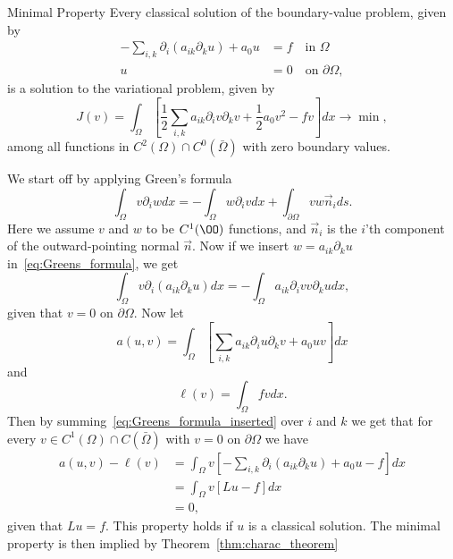 \begin{thmx}{Minimal Property}
    Every classical solution of the boundary-value problem, given by
\begin{align}
    -\sum_{i,k} \partial_i (a_{ik}\partial_k u) + a_0 u &= f \quad \text{in } \Omega  \\
    u &= 0 \quad \text{on } \partial \Omega,
\end{align}
    is a solution to the variational problem, given by
    \[
        J(v)=\int_\Omega \left [\frac{1}{2}\sum_{i,k} a_{ik} \partial_i v\partial_k v + \frac{1}{2} a_0 v^2 -fv\right ]dx \longrightarrow \min,
    \]
    among all functions in $C^2(\Omega)\cap C^0(\bar{\Omega})$ with zero boundary values. 
\end{thmx}
\begin{bev}
    We start off by applying Green's formula
    \begin{equation}
    \label{eq:Greens_formula}
        \int_\Omega v\partial_i w dx = -\int_\Omega w \partial_i v dx + \int_{\partial \Omega} v w \vec{n}_i ds.
    \end{equation}
    Here we assume $v$ and $w$ to be $C^1(\OO)$ functions, and $\vec{n}_i$ is the $i$'th component of the outward-pointing normal $\vec{n}$.
    Now if we insert $w=a_{ik}\partial_k u$ in~\eqref{eq:Greens_formula}, we get
    \begin{equation}
    \label{eq:Greens_formula_inserted}
        \int_\Omega v\partial_i (a_{ik} \partial_k u) dx = -\int_\Omega a_{ik} \partial_i v v\partial_k u dx,
    \end{equation}
    given that $v=0$ on $\partial \Omega$.
    Now let 
    \begin{equation}
    \label{eq:a(u,v)}
        a(u,v) = \int_\Omega \left[\sum_{i,k} a_{ik} \partial_i u \partial_k v +a_0 uv \right]dx
    \end{equation}
    and
    \begin{equation}
    \label{eq:l(v)}
        \ell(v) = \int_\Omega fv dx.
    \end{equation}
    Then by summing~\eqref{eq:Greens_formula_inserted} over $i$ and $k$ we get that for every $v\in C^1(\Omega) \cap C(\bar{\Omega})$ with $v=0$ on $\partial \Omega$ we have
    \begin{align}
        a(u,v) - \ell(v) &= \int_\Omega v\left[ -\sum_{i,k} \partial_i (a_{ik} \partial_k u) + a_0 u - f \right] dx \label{eq:min_prop_variational_problem}\\
        &= \int_\Omega v [Lu - f] dx \nonumber \\
        &= 0, \nonumber
    \end{align}
    given that $Lu = f$. This property holds if $u$ is a classical solution.
     The minimal property is then implied by Theorem~\ref{thm:charac_theorem}
\end{bev}